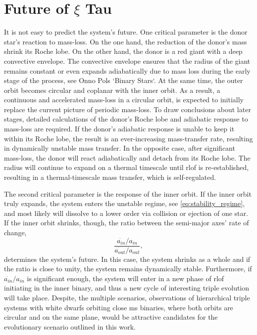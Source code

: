 \section{Future of $\xi$ Tau}\label{sec:discussion}

It is not easy to predict the system's future. One critical parameter is the donor star's reaction to mass-loss. On the one hand, the reduction of the donor's mass shrink its Roche lobe. On the other hand, the donor is a red giant with a deep convective envelope. The convective envelope ensures that the radius of the giant remains constant or even expands adiabatically due to mass loss during the early stage of the process, see Onno Pols `Binary Stars`. At the same time, the outer orbit becomes circular and coplanar with the inner orbit. As a result, a continuous and accelerated mass-loss in a circular orbit, is expected to initially replace the current picture of periodic mass-loss. To draw conclusions about later stages, detailed calculations of the donor's Roche lobe and adiabatic response to mass-loss are required. If the donor's adiabatic response is unable to keep it within its Roche lobe, the result is an ever-increasing mass-transfer rate, resulting in dynamically unstable mass transfer. In the opposite case, after significant mass-loss, the donor will react adiabatically and detach from its Roche lobe. The radius will continue to expand on a thermal timescale until \ac{rlof} is re-established, resulting in a thermal-timescale mass transfer, which is self-regulated.

The second critical parameter is the response of the inner orbit. If the inner orbit truly expands, the system enters the unstable regime, see \cref{eq:stability_regime}, and most likely will dissolve to a lower order via collision or ejection of one star. If the inner orbit shrinks, though, the ratio between the semi-major axes' rate of change,
\begin{equation}
    \frac{\dot{a_{in}}/a_{in}}{\dot{a_{out}}/a_{out}},
\end{equation}
determines the system's future. In this case, the system shrinks as a whole and if the ratio is close to unity, the system remains dynamically stable. Furthermore, if $\dot{a_{in}}/a_{in}$ is significant enough, the system will enter in a new phase of \ac{rlof} initiating in the inner binary, and thus a new cycle of interesting triple evolution will take place. Despite, the multiple scenarios, observations of hierarchical triple systems with white dwarfs orbiting close \ac{ms} binaries, where both orbits are circular and on the same plane, would be attractive candidates for the evolutionary scenario outlined in this work.

